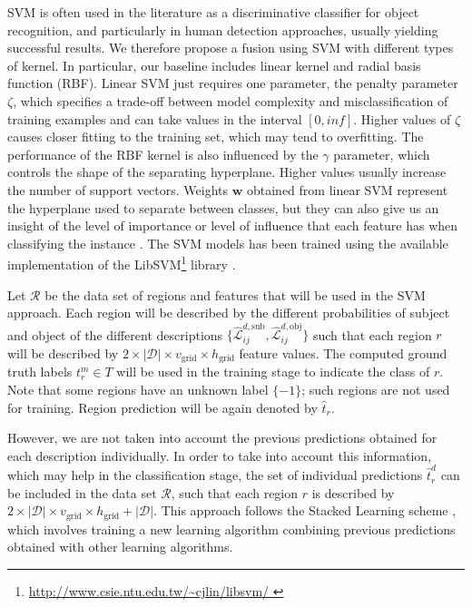 \documentclass[10pt,twocolumn,letterpaper]{article}
\begin{document}
SVM is often used in the literature as a discriminative classifier for object recognition, and particularly in human detection approaches, usually yielding successful results.  We therefore propose a fusion using SVM with different types of kernel. In particular, our baseline includes linear kernel and radial basis function (RBF). Linear SVM just requires one parameter, the penalty parameter $\zeta$, which specifies a trade-off between model complexity and misclassification of training examples and can take values in the interval $[0, inf]$. Higher values of $\zeta$ causes closer fitting to the training set, which may tend to overfitting. The performance of the RBF kernel is also influenced by the $\gamma$ parameter, which controls the shape of the separating hyperplane. Higher values usually increase the number of support vectors. Weights $\mathbf{w}$ obtained from linear SVM represent the hyperplane used to separate between classes, but they can also give us an insight of the level of importance or level of influence that each feature has when classifying the instance \cite{guyon2003introduction}. The SVM models has been trained using the available implementation of the LibSVM\footnote{\url{http://www.csie.ntu.edu.tw/~cjlin/libsvm/ }} library \cite{chang2011libsvm}.


Let $\mathcal{R}$ be the data set of regions and features that will be used in the SVM approach. Each region will be described by the different probabilities of subject and object of the different descriptions $\{\hat{\mathcal{L}}_{ij}^{d,\mathrm{sub}}, \hat{\mathcal{L}}_{ij}^{d,\mathrm{obj}}\}$ such that each region $r$ will be described by $2 \times |\mathcal{D}| \times v_\mathrm{grid} \times h_\mathrm{grid}$ feature values. The computed ground truth labels $t_{r}^{m} \in T$ will be used in the training stage to indicate the class of $r$. Note that some regions have an unknown label $\{-1\}$; such regions are not used for training. Region prediction will be again denoted by $\hat{t}_r$.

However, we are not taken into account the previous predictions obtained for each description individually. In order to take into account this information, which may help in the classification stage, the set of individual predictions $\hat{t}_{r}^{d}$ can be included in the data set $\mathcal{R}$, such that each region $r$ is described by $2 \times |\mathcal{D}| \times v_\mathrm{grid} \times h_\mathrm{grid} + |\mathcal{D}|$. This approach follows the Stacked Learning scheme \cite{cohen2005stacked, gatta2011multi}, which involves training a new learning algorithm combining previous predictions obtained with other learning algorithms. 
\end{document}
